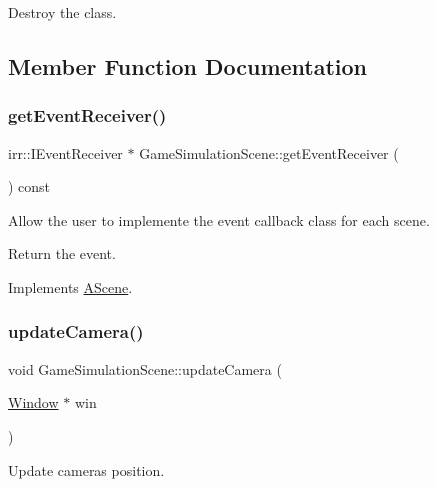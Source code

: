 Destroy the class. 

\subsection{Member Function Documentation}
\mbox{\label{classGameSimulationScene_a048b2a937caff3af7b4d54f8bd404ec1}} 
\subsubsection{\texorpdfstring{get\+Event\+Receiver()}{getEventReceiver()}}
{\footnotesize\ttfamily irr\+::\+I\+Event\+Receiver $\ast$ Game\+Simulation\+Scene\+::get\+Event\+Receiver (\begin{DoxyParamCaption}{ }\end{DoxyParamCaption}) const\hspace{0.3cm}{\ttfamily [virtual]}}



Allow the user to implemente the event callback class for each scene. 

Return the event. 

Implements \hyperlink{classAScene_af521e5e6d30a5d2e5d30eb333e4d3abd}{A\+Scene}.

\mbox{\label{classGameSimulationScene_a66b107f708b5eed87a3c0a0016541d29}} 
\subsubsection{\texorpdfstring{update\+Camera()}{updateCamera()}}
{\footnotesize\ttfamily void Game\+Simulation\+Scene\+::update\+Camera (\begin{DoxyParamCaption}\item[{\hyperlink{classWindow}{Window} $\ast$}]{win }\end{DoxyParamCaption})\hspace{0.3cm}{\ttfamily [virtual]}}



Update camera\textquotesingle{}s position. 


